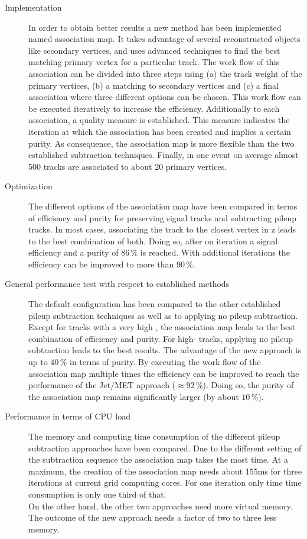 \begin{description}

\item[Implementation] In order to obtain better results a new method has been implemented named association map. It takes advantage of several reconstructed objects like secondary vertices, and uses advanced techniques to find the best matching primary vertex for a particular track. The work flow of this association can be divided into three steps using (a) the track weight of the primary vertices, (b) a matching to secondary vertices and (c) a final association where three different options can be chosen. This work flow can be executed iteratively to increase the efficiency. Additionally to each association, a quality measure is established. This measure indicates the iteration at which the association has been created and implies a certain purity. As consequence, the association map is more flexible than the two established subtraction techniques. Finally, in one event on average almost 500 tracks are associated to about 20 primary vertices.

\item[Optimization] The different options of the association map have been compared in terms of efficiency and purity for preserving signal tracks and subtracting pileup tracks. In most cases, associating the track to the closest vertex in z leads to the best combination of both. Doing so, after on iteration a signal efficiency and a purity of $86\,\%$ is reached. With additional iterations the efficiency can be improved to more than $90\,\%$.

\item[General performance test with respect to established methods] The default configuration has been compared to the other established pileup subtraction techniques as well as to applying no pileup subtraction. Except for tracks with a very high \pt{}, the association map leads to the best combination of efficiency and purity. For high-\pt{} tracks, applying no pileup subtraction leads to the best results. The advantage of the new approach is up to $40\,\%$ in terms of purity. By executing the work flow of the association map multiple times the efficiency can be improved to reach the performance of the Jet/MET approach ($\approx92\,\%$). Doing so, the purity of the association map remains significantly larger (by about $10\,\%$).

\item[Performance in terms of CPU load] The memory and computing time consumption of the different pileup subtraction approaches have been compared. Due to the different setting of the subtraction sequence the association map takes the most time. At a maximum, the creation of the association map needs about 155\unit{ms} for three iterations at current grid computing cores. For one iteration only time time consumption is only one third of that. \\
On the other hand, the other two approaches need more virtual memory. The outcome of the new approach needs a factor of two to three less memory.


\end{description}
